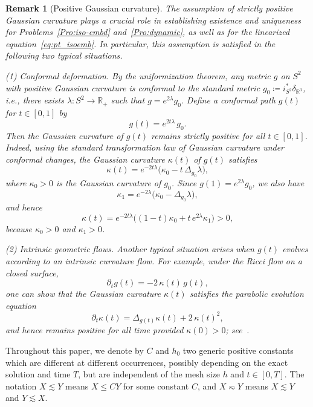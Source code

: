 \documentclass[11pt,a4paper,oneside,reqno]{amsart}
\theoremstyle{definition}
\theoremstyle{plain}
\newtheorem{remark}{Remark}[section]
\numberwithin{theorem}{section}
\numberwithin{proposition}{section}
\numberwithin{lemma}{section}
\numberwithin{equation}{section}
\begin{document}
\begin{remark}[Positive Gaussian curvature]
\label{rmk:posi_curv}
\upshape
The assumption of strictly positive Gaussian curvature plays a crucial role in establishing existence and uniqueness for Problems~\ref{Pro:iso-embd} and~\ref{Pro:dynamic}, as well as for the linearized equation~\eqref{eq:pt_isoemb}.
In particular, this assumption is satisfied in the following two typical situations.\medskip

\noindent\textit{(1) Conformal deformation.}
By the uniformization theorem, any metric \(g\) on \(S^2\) with positive Gaussian curvature is conformal to the standard metric \(g_0\coloneqq i_{S^2}^*\delta_{\mathbb{R}^3}\), i.e., there exists \(\lambda:S^2\to\mathbb{R}_+\) such that
\(
g = e^{2\lambda} g_0 .
\)
Define a conformal path \(g(t)\) for \(t\in[0,1]\) by
\[
g(t) = e^{2t\lambda}\, g_0 .
\]
Then the Gaussian curvature of \(g(t)\) remains strictly positive for all \(t\in[0,1]\).
Indeed, using the standard transformation law of Gaussian curvature under conformal changes, the Gaussian curvature \(\kappa(t)\) of \(g(t)\) satisfies
\[
\kappa(t) = e^{-2t\lambda}\bigl(\kappa_0 - t\,\Delta_{g_0}\lambda\bigr),
\]
where \(\kappa_0>0\) is the Gaussian curvature of \(g_0 \).
Since \(g(1)=e^{2\lambda}g_0\), we also have
\[
\kappa_1 = e^{-2\lambda}\bigl(\kappa_0-\Delta_{g_0}\lambda\bigr),
\]
and hence
\[
\kappa(t)
= e^{-2t\lambda}\bigl((1-t)\kappa_0 + t\,e^{2\lambda}\kappa_1\bigr) > 0,
\]
because \(\kappa_0>0\) and \(\kappa_1>0\).\medskip

\noindent\textit{(2) Intrinsic geometric flows.}
Another typical situation arises when \(g(t)\) evolves according to an intrinsic curvature flow.
For example, under the Ricci flow on a closed surface,
\[
\partial_t g(t) = -2\,\kappa(t)\, g(t),
\]
one can show that the Gaussian curvature \(\kappa(t)\) satisfies the parabolic evolution equation
\[
\partial_t \kappa(t) = \Delta_{g(t)} \kappa(t) + 2\,\kappa(t)^2,
\]
and hence remains positive for all time provided \(\kappa(0)>0\); see~\cite[Corollary~2.11]{chow2023hamilton}.
\end{remark}


Throughout this paper, we denote by $C$ and $h_{0}$ two generic positive constants which are different at different occurrences, possibly depending on the exact solution and time $T$, but are independent of the mesh size $h$ and $t\in[0,T]$. The notation $X \lesssim Y$ means $X \leq C Y$ for some constant $C$, and $X \eqsim Y$ means $X \lesssim Y$ and $Y \lesssim X$.
\end{document}
